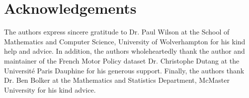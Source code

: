 \documentclass[12pt,letterpaper]{article}
\numberwithin{equation}{section}
\numberwithin{equation}{section}
\numberwithin{equation}{section}
\begin{document}
\section*{Acknowledgements}
The authors express sincere gratitude to Dr. Paul Wilson at the School of Mathematics and Computer Science, University of Wolverhampton for his kind help and advice. In addition, the authors wholeheartedly thank the author and maintainer of the French Motor Policy dataset Dr. Christophe Dutang at the  Universit\' e Paris Dauphine for his generous support. Finally, the authors thank Dr. Ben Bolker at the Mathematics and Statistics Department, McMaster University for his kind advice.


\end{document}
